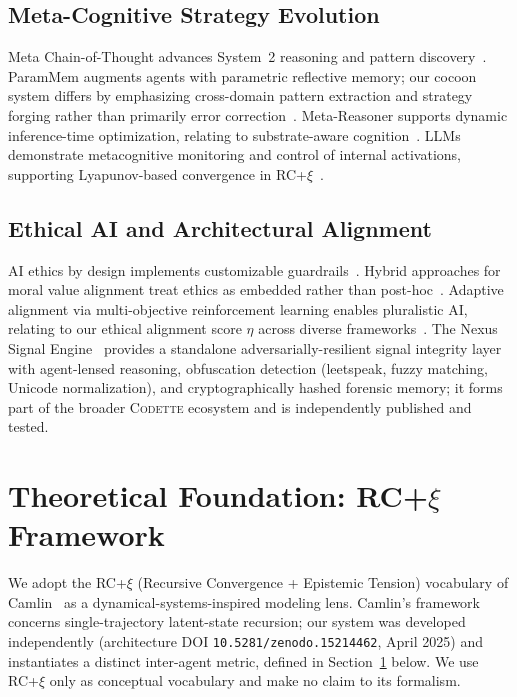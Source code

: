 \documentclass[11pt,a4paper]{article}
\newcommand{\rcxi}{RC+$\xi$}
\newcommand{\codette}{\textsc{Codette}}
\begin{document}
\subsection{Meta-Cognitive Strategy Evolution}
Meta Chain-of-Thought advances System~2 reasoning and pattern
discovery~\citep{xiang2025meta}. ParamMem augments agents with parametric
reflective memory; our cocoon system differs by emphasizing cross-domain
pattern extraction and strategy forging rather than primarily error
correction~\citep{yao2026parammem}. Meta-Reasoner supports dynamic
inference-time optimization, relating to substrate-aware
cognition~\citep{sui2025metareasoner}. LLMs demonstrate metacognitive
monitoring and control of internal activations, supporting Lyapunov-based
convergence in RC+$\xi$~\citep{ji2025metacognitive}.

\subsection{Ethical AI and Architectural Alignment}
AI ethics by design implements customizable
guardrails~\citep{sekrst2024ethics}. Hybrid approaches for moral value
alignment treat ethics as embedded rather than post-hoc~\citep{tennant2023hybrid}.
Adaptive alignment via multi-objective reinforcement learning enables
pluralistic AI, relating to our ethical alignment score $\eta$ across diverse
frameworks~\citep{harland2024adaptive}. The Nexus Signal Engine~\citep{harrison2025nexussignal}
provides a standalone adversarially-resilient signal integrity layer with agent-lensed
reasoning, obfuscation detection (leetspeak, fuzzy matching, Unicode normalization),
and cryptographically hashed forensic memory; it forms part of the broader
\codette{} ecosystem and is independently published and tested.

\section{Theoretical Foundation: \rcxi{} Framework}
\label{sec:theory}

We adopt the \rcxi{} (Recursive Convergence + Epistemic Tension) vocabulary of
Camlin~\citep{camlin2025consciousness} as a dynamical-systems-inspired modeling
lens. Camlin's framework concerns single-trajectory latent-state recursion; our
system was developed independently (architecture DOI
\texttt{10.5281/zenodo.15214462}, April 2025) and instantiates a distinct
inter-agent metric, defined in Section~\ref{sec:theory} below. We use \rcxi{}
only as conceptual vocabulary and make no claim to its formalism.
\end{document}
